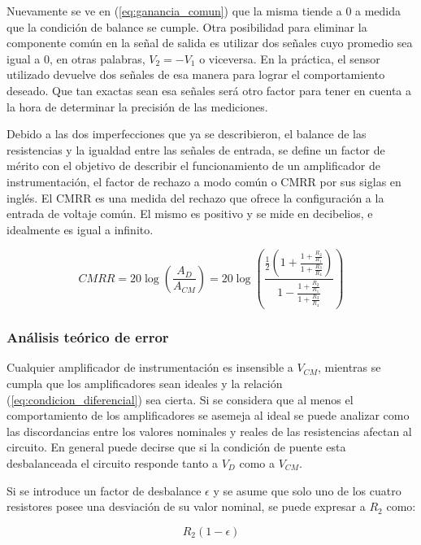 Nuevamente se ve en (\ref{eq:ganancia_comun}) que la misma tiende a 0 a medida que la condición de balance se cumple. Otra posibilidad para eliminar la componente común en la señal de salida es utilizar dos señales cuyo promedio sea igual a 0, en otras palabras, $V_2 = - V_1$ o viceversa. En la práctica, el sensor utilizado devuelve dos señales de esa manera para lograr el comportamiento deseado. Que tan exactas sean esa señales será otro factor para tener en cuenta a la hora de determinar la precisión de las mediciones. 

Debido a las dos imperfecciones que ya se describieron, el balance de las resistencias y la igualdad entre las señales de entrada, se define un factor de mérito con el objetivo de describir el funcionamiento de un amplificador de instrumentación, el factor de rechazo a modo común o CMRR por sus siglas en inglés. El CMRR es una medida del rechazo que ofrece la configuración a la entrada de  voltaje común. El mismo es positivo y se mide en decibelios, e idealmente es igual a infinito.

\begin{equation}\label{eq:CMRR}
CMRR   =   20\log(\frac{A_D}{A_{CM}})   = 20\log(\frac{\frac{1}{2}(1 + \frac{1 + \frac{R_2}{R_1}}{1 + \frac{R_3}{R_4}})}{1 - \frac{1 + \frac{R_2}{R_1}}{1 + \frac{R_3}{R_4}}})
\end{equation}

\subsubsection{Análisis teórico de error}

Cualquier amplificador de instrumentación es insensible a $V_{CM}$, mientras se cumpla que los amplificadores sean ideales y la relación (\ref{eq:condicion_diferencial}) sea cierta. Si se considera que al menos el comportamiento de los amplificadores se asemeja al ideal se puede analizar como las discordancias entre los valores nominales y reales de las resistencias afectan al circuito. En general puede decirse que si la condición de puente esta desbalanceada el circuito responde tanto a $V_D$ como a $V_{CM}$.

Si se introduce un factor de desbalance $\epsilon$ y se asume que solo uno de los cuatro resistores posee una desviación de su valor nominal, se puede expresar a $R_2$ como:

\begin{equation}\label{R_2_epsilon}
R_2(1 - \epsilon)
\end{equation} 

